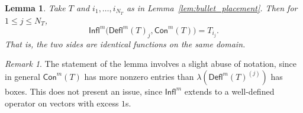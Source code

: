 \documentclass[12pt]{amsart}
\newtheorem{lemma}[theorem]{Lemma}
\theoremstyle{definition}
\theoremstyle{remark}
\newtheorem{remark}[theorem]{Remark}
\numberwithin{equation}{section}
\newcommand{\deflate}{\ensuremath{\mathsf{Defl}}}
\newcommand{\tinflate}{\ensuremath{\mathsf{Infl}}}
\newcommand{\content}{\ensuremath{\mathsf{Con}}}
\begin{document}
\begin{lemma} \label{lem:gappy_promotion}
Take $T$ and $i_1, \ldots, i_{N_T}$ as in Lemma~\ref{lem:bullet_placement}. Then for $1 \leq j \leq N_T$, 
\begin{equation}\label{eq:gappy_promotion}
 \tinflate^m \Big( \deflate^m(T)_j, \content^m(T) \Big) = T_{i_j}.
\end{equation}
That is, the two sides are identical functions on the same domain. 
\end{lemma}
\begin{remark}The statement of the lemma involves a slight abuse of notation, since in general $\content^m(T)$ has more nonzero entries than $\lambda(\deflate^m(T)^{(j)})$ has boxes. This does not present an issue, since $\tinflate^m$ extends to a well-defined operator on vectors with excess $1$s.
\end{remark}
\end{document}
